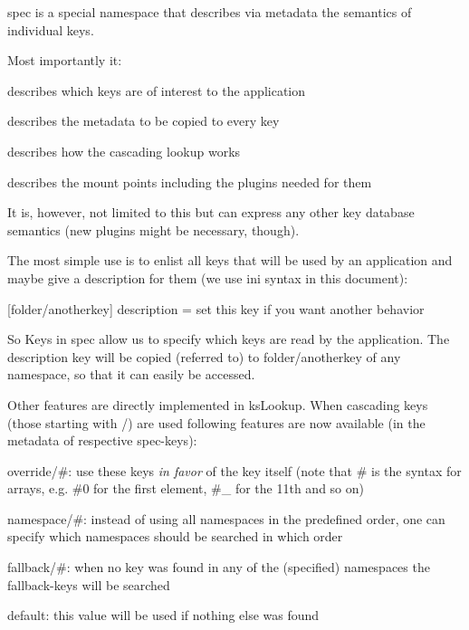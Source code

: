 spec is a special namespace that describes via metadata the semantics of individual keys.

Most importantly it\+:


\begin{DoxyEnumerate}
\item describes which keys are of interest to the application
\item describes the metadata to be copied to every key
\item describes how the cascading lookup works
\item describes the mount points including the plugins needed for them
\end{DoxyEnumerate}

It is, however, not limited to this but can express any other key database semantics (new plugins might be necessary, though).

The most simple use is to enlist all keys that will be used by an application and maybe give a description for them (we use ini syntax in this document)\+:


\begin{DoxyCode}
[mykey]

[folder/anotherkey]
description = set this key if you want another behavior
\end{DoxyCode}


So Keys in {\ttfamily spec} allow us to specify which keys are read by the application. The description key will be copied (referred to) to {\ttfamily folder/anotherkey} of any namespace, so that it can easily be accessed.

Other features are directly implemented in {\ttfamily ks\+Lookup}. When cascading keys (those starting with {\ttfamily /}) are used following features are now available (in the metadata of respective {\ttfamily spec}-\/keys)\+:


\begin{DoxyItemize}
\item {\ttfamily override/\#}\+: use these keys {\itshape in favor} of the key itself (note that {\ttfamily \#} is the syntax for arrays, e.\+g. {\ttfamily \#0} for the first element, {\ttfamily \#\+\_} for the 11th and so on)
\item {\ttfamily namespace/\#}\+: instead of using all namespaces in the predefined order, one can specify which namespaces should be searched in which order
\item {\ttfamily fallback/\#}\+: when no key was found in any of the (specified) namespaces the {\ttfamily fallback}-\/keys will be searched
\item {\ttfamily default}\+: this value will be used if nothing else was found
\end{DoxyItemize}

